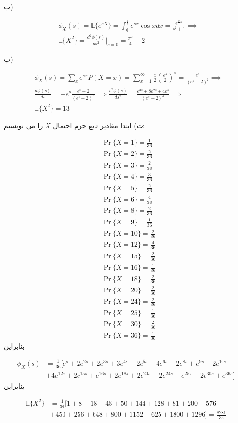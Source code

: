 \documentclass{article}
\newcommand{\eqn}[1]{
\[\begin{split}
#1
\end{split}\]
}
\begin{document}
ب)
\eqn{
&\phi_X(s)
=\mathbb{E}\{e^{sX}\}
=\int_0^\frac{\pi}{2} e^{sx}\cos xdx=\frac{e^{\frac{\pi}{2}s}}{s^2+1}
\implies
\\&
\mathbb{E}\{X^2\}=\frac{d^2\phi(s)}{ds^2}\Big|_{s=0}
=\frac{\pi^2}{4}-2
}

پ)
\eqn{
&\phi_X(s)=\sum_x e^{sx}P(X=x)
=\sum_{x=1}^\infty \frac{x}{2}(\frac{e^s}{2})^x
=\frac{e^s}{(e^s-2)^2}
\implies
\\&
\frac{d\phi(s)}{ds}=-e^s\frac{e^s+2}{(e^s-2)^3}
\implies
\frac{d^2\phi(s)}{ds^2}=\frac{e^{3s}+8e^{2s}+4e^s}{(e^s-2)^4}
\implies
\\&
\mathbb{E}\{X^2\}=13
}{}

ت) ابتدا مقادیر تابع جرم احتمال $X$ را می نویسیم:
\eqn{
&\Pr\{X=1\}=\frac{1}{36}
\\&\Pr\{X=2\}=\frac{2}{36}
\\&\Pr\{X=3\}=\frac{2}{36}
\\&\Pr\{X=4\}=\frac{3}{36}
\\&\Pr\{X=5\}=\frac{2}{36}
\\&\Pr\{X=6\}=\frac{4}{36}
\\&\Pr\{X=8\}=\frac{2}{36}
\\&\Pr\{X=9\}=\frac{1}{36}
\\&\Pr\{X=10\}=\frac{2}{36}
\\&\Pr\{X=12\}=\frac{4}{36}
\\&\Pr\{X=15\}=\frac{2}{36}
\\&\Pr\{X=16\}=\frac{1}{36}
\\&\Pr\{X=18\}=\frac{2}{36}
\\&\Pr\{X=20\}=\frac{2}{36}
\\&\Pr\{X=24\}=\frac{2}{36}
\\&\Pr\{X=25\}=\frac{1}{36}
\\&\Pr\{X=30\}=\frac{2}{36}
\\&\Pr\{X=36\}=\frac{1}{36}
}{}
بنابراین
\eqn{
\phi_X(s)&=
\frac{1}{36}[
e^s+
2e^{2s}+
2e^{3s}+
3e^{4s}+
2e^{5s}+
4e^{6s}+
2e^{8s}+
e^{9s}+
2e^{10s}
\\&+
4e^{12s}+
2e^{15s}+
e^{16s}+
2e^{18s}+
2e^{20s}+
2e^{24s}+
e^{25s}+
2e^{30s}+
e^{36s}
]
}{}
بنابراین
\eqn{
\mathbb{E}\{X^2\}&=
\frac{1}{36}[1+8+18+48+50+144+128+81+200+576\\&+450+256+648+800+1152+625+1800+1296]
=\frac{8281}{36}
}{}
\end{document}
